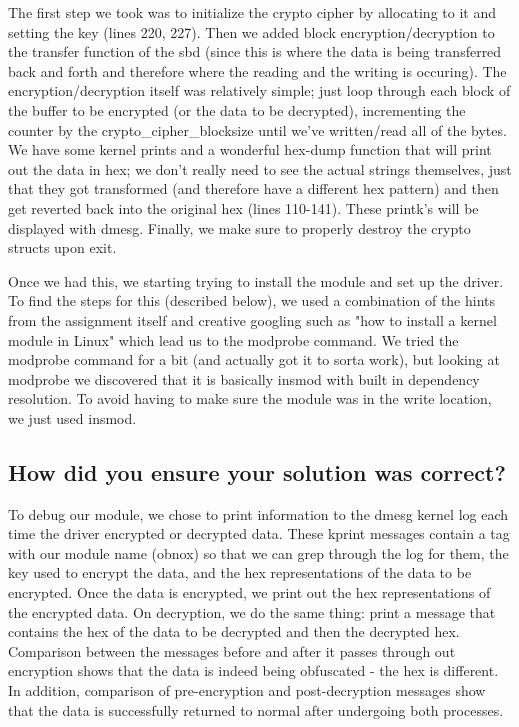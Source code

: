 \documentclass[letterpaper,10pt,titlepage]{article}
\begin{document}
The first step we took was to initialize the crypto cipher by allocating to it and setting the key (lines 220, 227). 
Then we added block encryption/decryption to the transfer function of the sbd (since this is where the data is being transferred back and forth and therefore where the reading and the writing is occuring). 
The encryption/decryption itself was relatively simple; just loop through each block of the buffer to be encrypted (or the data to be decrypted), incrementing the counter by the crypto\_cipher\_blocksize until we've written/read all of the bytes.  
We have some kernel prints and a wonderful hex-dump function that will print out the data in hex; we don't really need to see the actual strings themselves, just that they got transformed (and therefore have a different hex pattern) and then get reverted back into the original hex (lines 110-141). 
These printk's will be displayed with dmesg. 
Finally, we make sure to properly destroy the crypto structs upon exit. 

Once we had this, we starting trying to install the module and set up the driver.
To find the steps for this (described below), we used a combination of the hints from the assignment itself and creative googling such as "how to install a kernel module in Linux" which lead us to the modprobe command. 
We tried the modprobe command for a bit (and actually got it to sorta work), but looking at modprobe we discovered that it is basically insmod with built in dependency resolution. 
To avoid having to make sure the module was in the write location, we just used insmod. 

\subsection{How did you ensure your solution was correct?}
To debug our module, we chose to print information to the dmesg kernel log each time the driver encrypted or decrypted data. 
These kprint messages contain a tag with our module name (obnox) so that we can grep through the log for them, the key used to encrypt the data, and the hex representations of the data to be encrypted.
Once the data is encrypted, we print out the hex representations of the encrypted data.
On decryption, we do the same thing: print a message that contains the hex of the data to be decrypted and then the decrypted hex. 
Comparison between the messages before and after it passes through out encryption shows that the data is indeed being obfuscated - the hex is different.
In addition, comparison of pre-encryption and post-decryption messages show that the data is successfully returned to normal after undergoing both processes.
\end{document}
